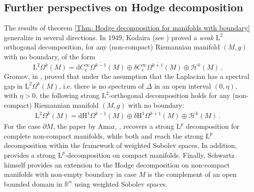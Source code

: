 \subsection{Further perspectives on Hodge decomposition}\label{Sec: weak-Hodge decomposition}
	The results of theorem \ref{Thm: Hodge decomposition for manifolds with boundary} generalize in several directions.
	In 1949, Kodaira (see \cite{Kodaira-49}) proved a \emph{weak} $\mathrm{L}^2$ orthogonal decomposition, for any (non-compact) Riemannian manifold $(M,g)$ with no boundary, of the form
	\begin{equation}
		\mathrm{L}^2\Omega^k(M)=\overline{\mathrm{d}C^\infty_\mathrm{c}\Omega^{k-1}(M)}\oplus\overline{\delta C^\infty_\mathrm{c}\Omega^{k+1}(M)}\oplus\mathcal{H}^k(M)\,.
	\end{equation}
	Gromov, in \cite{Gromov-91}, proved that under the assumption that the Laplacian has a spectral gap in $\mathrm{L}^2\Omega^k(M)$, i.e. there is no spectrum of $\Delta$ in an open interval $(0, \eta)$, with $\eta>0$, the following strong $\mathrm{L}^2$-orthogonal decomposition holds for any (non-compact) Riemannian manifold $(M,g)$ with no boundary:
	\begin{align}
	\mathrm{L}^2\Omega^k(M)=\mathrm{d}\mathrm{H}^1\Omega^{k-1}(M)\oplus\delta \mathrm{H}^1\Omega^{k+1}(M)\oplus\mathcal{H}^k(M)\,.
	\end{align}
	For the case $\partial M$, the paper by Amar, \cite{Amar-17}, recovers a strong $\mathrm{L}^p$ decomposition for complete non-compact manifolds, while both \cite{Li-09} and \cite{Zulfikar-Stroock-00} reach the strong $\mathrm{L}^p$ decomposition within the framework of weighted Sobolev spaces.  In addition, \cite{Scott-95} provides a strong $\mathrm{L}^p$-decomposition on compact manifolds. Finally, Schwartz \cite{Schwarz-95} himself provides an extension to the Hodge decomposition on non-compact manifolds with non-empty boundary in case $M$ is the complement of an open bounded domain in $\mathbb{R}^n$ using weighted Sobolev spaces.
	
